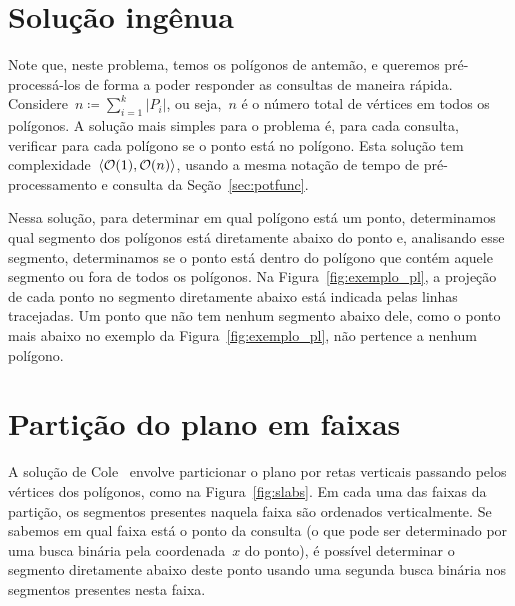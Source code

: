 \documentclass[../../main.tex]{subfiles}
\begin{document}
\section{Solução ingênua}

Note que, neste problema, temos os polígonos de antemão, e queremos pré-processá-los de forma a poder responder as consultas de maneira rápida. Considere~${n \coloneqq \sum\limits_{i = 1}^k{|P_i|}}$, ou seja,~$n$ é o número total de vértices em todos os polígonos. A solução mais simples para o problema é, para cada consulta, verificar para cada polígono se o ponto está no polígono. Esta solução tem complexidade~$\langle\mathcal{O}(1), \mathcal{O}(n)\rangle$, usando a mesma notação de tempo de pré-processamento e consulta da Seção~\ref{sec:potfunc}.

Nessa solução, para determinar em qual polígono está um ponto, determinamos qual segmento dos polígonos está diretamente abaixo do ponto e, analisando esse segmento, determinamos se o ponto está dentro do polígono que contém aquele segmento ou fora de todos os polígonos. Na Figura~\ref{fig:exemplo_pl}, a projeção de cada ponto no segmento diretamente abaixo está indicada pelas linhas tracejadas. Um ponto que não tem nenhum segmento abaixo dele, como o ponto mais abaixo no exemplo da Figura~\ref{fig:exemplo_pl}, não pertence a nenhum polígono.

\section{Partição do plano em faixas}

A solução de Cole~\cite{Cole86} envolve particionar o plano por retas verticais passando pelos vértices dos polígonos, como na Figura~\ref{fig:slabs}. Em cada uma das faixas da partição, os segmentos presentes naquela faixa são ordenados verticalmente. Se sabemos em qual faixa está o ponto da consulta (o que pode ser determinado por uma busca binária pela coordenada~$x$ do ponto), é possível determinar o segmento diretamente abaixo deste ponto usando uma segunda busca binária nos segmentos presentes nesta faixa.
\end{document}
